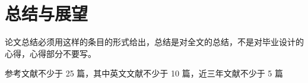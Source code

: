 \section{总结与展望}
论文总结必须用这样的条目的形式给出，总结是对全文的总结，不是对毕业设计的心得，心得部分不要写。

参考文献不少于 25 篇，其中英文文献不少于 10 篇，近三年文献不少于 5 篇